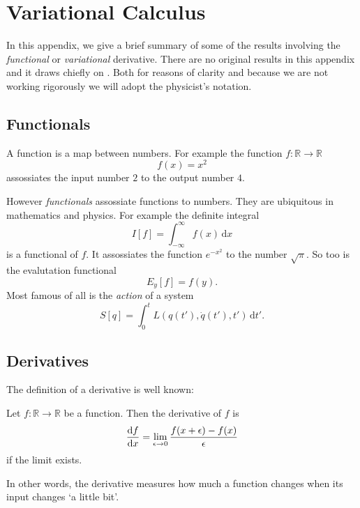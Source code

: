 \chapter{Variational Calculus}
\label{appendix:variational_calculus}

In this appendix, we give a brief summary of some of the results involving the \emph{functional} or \emph{variational} derivative.
There are no original results in this appendix and it draws chiefly on \cite{Lancaster2014}. Both for reasons of clarity and because we are not
working rigorously we will adopt the physicist's notation.

\section{Functionals}
A function is a map between numbers. For example the function $f\colon \mathbb{R} \rightarrow \mathbb{R}$
\begin{equation}
  \label{eq:example_function}
  f(x) = x^2
\end{equation}
assossiates the input number $2$ to the output number $4$.

However \emph{functionals} assossiate functions to numbers. They are ubiquitous in mathematics and physics. For example
the definite integral
\begin{equation}
  \label{eq:example_functional_definite_integral}
  I[f] = \int_{-\infty}^{\infty} f(x) \, \mathrm{d}x
\end{equation}
is a functional of $f$. It assossiates the function $e^{-x^2}$ to the number $\sqrt{\pi}$.
So too is the evalutation functional
\begin{equation}
  \label{eq:example_functional_evaluation}
  E_y[f] = f(y).
\end{equation}
Most famous of all is the \emph{action} of a system
\begin{equation}
  \label{eq:example_functional_action}
  S[q] = \int_0^t L(q(t'),\dot{q}(t'),t')\,\mathrm{d}t'.
\end{equation}

\section{Derivatives}
The definition of a derivative is well known:
\begin{definition}
  \label{definition:derivative}
  Let $f\colon \mathbb{R} \rightarrow \mathbb{R}$ be a function. Then the derivative of $f$ is
  \begin{equation}
    \label{eq:definition_of_derivative}
    \dv{f}{x} = \lim_{\epsilon\rightarrow 0} \frac{f(x + \epsilon) - f(x)}{\epsilon}
  \end{equation}
  if the limit exists.
\end{definition}
In other words, the derivative measures how much a function changes when its input changes `a little bit'.

